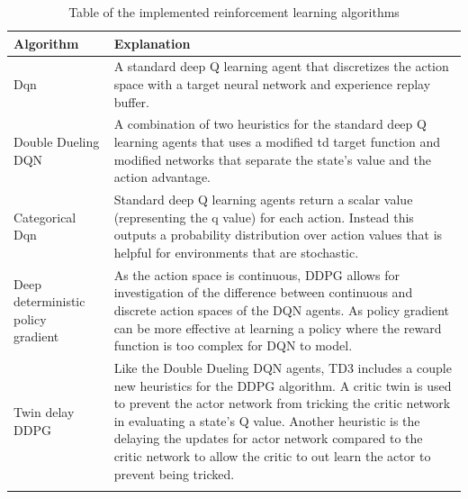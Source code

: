 \begin{longtable}{|p{5cm}|p{10cm}|}
    \textbf{Algorithm} & \textbf{Explanation} \\ \hline
    Dqn~\citep{mnih2015humanlevel} & A standard deep Q learning agent that discretizes the action space with a
        target neural network and experience replay buffer. \\ \hline
    Double Dueling DQN~\citep{doubledqn, duelingdqn} & A combination of two heuristics for the standard deep Q
        learning agents that uses a modified td target function and modified networks that separate the state's value
        and the action advantage. \\ \hline
    Categorical Dqn~\citep{distributional_dqn} & Standard deep Q learning agents return a scalar value
        (representing the q value) for each action. Instead this outputs a probability distribution over action
        values that is helpful for environments that are stochastic. \\ \hline
    Deep deterministic policy gradient~\citep{ddpg} & As the action space is continuous, DDPG allows for
        investigation of the difference between continuous and discrete action spaces of the DQN agents. As policy
        gradient can be more effective at learning a policy where the reward function is too complex for DQN to
        model. \\ \hline
    Twin delay DDPG~\citep{td3} & Like the Double Dueling DQN agents, TD3 includes a couple new heuristics for the
        DDPG algorithm. A critic twin is used to prevent the actor network from tricking the critic network in
        evaluating a state's Q value. Another heuristic is the delaying the updates for actor network compared to the
        critic network to allow the critic to out learn the actor to prevent being tricked.\\ \hline
    \caption{Table of the implemented reinforcement learning algorithms}
    \label{tab:reinforcement_learning_algorithms}
\end{longtable}


